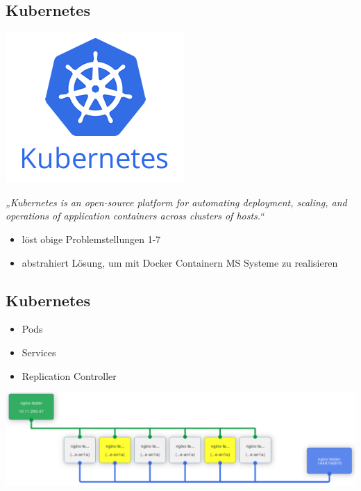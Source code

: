 \documentclass{beamer}
\begin{document}
\subsection{Kubernetes}
\begin{frame}{\insertsubsection}
	\centering
	\includegraphics[width=.3\linewidth]{img/kubernetes_logo.png}
	\vspace*{1em}

	\textit{„Kubernetes is an open-source platform for automating deployment, scaling, and operations of application containers across clusters of hosts.“}\cite{k8sdoc}
	\vspace*{1em}	
	\begin{itemize}
		\setlength\itemsep{1em}
		\item löst obige Problemstellungen 1-7
		\item abstrahiert Lösung, um mit Docker Containern MS Systeme zu realisieren
	\end{itemize}
\end{frame}

\subsection{Kubernetes}
\begin{frame}{\insertsubsection}
	\begin{itemize}
		\setlength\itemsep{1em}
		\item Pods
		\item Services
		\item Replication Controller
	\end{itemize}
	\vspace{1em}
	\includegraphics[width=\linewidth]{img/pods-getting-ready-k8s.pdf}
\end{frame}
		
\end{document}
